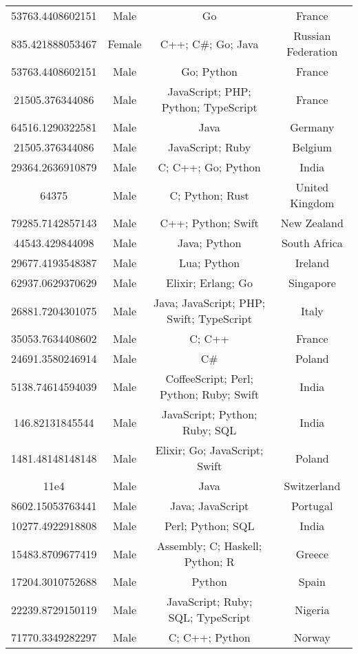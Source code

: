 \begin{center}
\begin{tabular}{ |c|c|c|c| }
53763.4408602151  &  Male  &  Go  &  France  \\ 
835.421888053467  &  Female  &  C++; C\#; Go; Java  &  Russian Federation  \\ 
53763.4408602151  &  Male  &  Go; Python  &  France  \\ 
21505.376344086  &  Male  &  JavaScript; PHP; Python; TypeScript  &  France  \\ 
64516.1290322581  &  Male  &  Java  &  Germany  \\ 
21505.376344086  &  Male  &  JavaScript; Ruby  &  Belgium  \\ 
29364.2636910879  &  Male  &  C; C++; Go; Python  &  India  \\ 
64375  &  Male  &  C; Python; Rust  &  United Kingdom  \\ 
79285.7142857143  &  Male  &  C++; Python; Swift  &  New Zealand  \\ 
44543.429844098  &  Male  &  Java; Python  &  South Africa  \\ 
29677.4193548387  &  Male  &  Lua; Python  &  Ireland  \\ 
62937.0629370629  &  Male  &  Elixir; Erlang; Go  &  Singapore  \\ 
26881.7204301075  &  Male  &  Java; JavaScript; PHP; Swift; TypeScript  &  Italy  \\ 
35053.7634408602  &  Male  &  C; C++  &  France  \\ 
24691.3580246914  &  Male  &  C\#  &  Poland  \\ 
5138.74614594039  &  Male  &  CoffeeScript; Perl; Python; Ruby; Swift  &  India  \\ 
146.82131845544  &  Male  &  JavaScript; Python; Ruby; SQL  &  India  \\ 
1481.48148148148  &  Male  &  Elixir; Go; JavaScript; Swift  &  Poland  \\ 
11e4  &  Male  &  Java  &  Switzerland  \\ 
8602.15053763441  &  Male  &  Java; JavaScript  &  Portugal  \\ 
10277.4922918808  &  Male  &  Perl; Python; SQL  &  India  \\ 
15483.8709677419  &  Male  &  Assembly; C; Haskell; Python; R  &  Greece  \\ 
17204.3010752688  &  Male  &  Python  &  Spain  \\ 
22239.8729150119  &  Male  &  JavaScript; Ruby; SQL; TypeScript  &  Nigeria  \\ 
71770.3349282297  &  Male  &  C; C++; Python  &  Norway  \\ 

\end{tabular}
\end{center}
